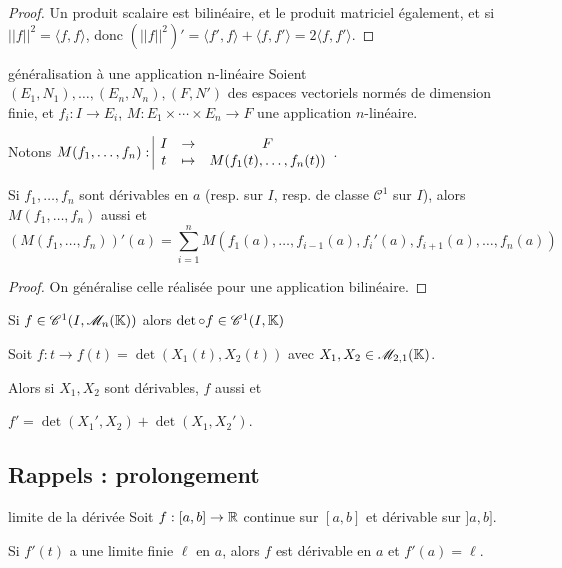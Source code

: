 
\begin{proof}
    Un produit scalaire est bilinéaire, et le produit matriciel également, et si 
    $||f||^2 = \langle f, f \rangle$, donc $(||f||^2)' = \langle f', f \rangle + \langle f, f' \rangle = 2 \langle f, f' \rangle$.
\end{proof}

\begin{theoreme}{généralisation à une application n-linéaire}{}
    Soient $(E_1, N_1), \ldots, (E_n, N_n), (F, N')$ des espaces vectoriels normés de dimension finie, et
    $f_i : I \to E_i$, $M : E_1 \times \cdots \times E_n \to F$ une application $n$-linéaire.

    \avspace Notons $M(f_1, \ldots, f_n): \space \begin{array}{|ccc} \displaystyle I & \to & \displaystyle F \\ \displaystyle t & \mapsto & \displaystyle M(f_1(t), \ldots, f_n(t)) \end{array}$.

    \avspace Si $f_1, \ldots, f_n$ sont dérivables en $a$ (resp. sur $I$, resp. de classe $\mathscr C^1$ sur $I$),
    alors $M(f_1, \ldots, f_n)$ aussi et 
    $$(M(f_1, \ldots, f_n))'(a) = \sum_{i=1}^n M(f_1(a), \ldots, f_{i-1}(a), f_i'(a), f_{i+1}(a), \ldots, f_n(a))$$
\end{theoreme}

\begin{proof}
    On généralise celle réalisée pour une application bilinéaire.
\end{proof}

\begin{corollaire}{}{}
    Si $f \in \mathscr C^1(I, \mathscr M_n(\mathbb{K}))$ alors $\det \circ f \in \mathscr C^1(I, \mathbb{K})$
\end{corollaire}

\begin{exemple}
    Soit $f: t \to f(t) = \det(X_1(t), X_2(t))$ avec $X_1, X_2 \in \mathscr M_{2, 1}(\mathbb{K})$. 

    Alors si $X_1, X_2$ sont dérivables, $f$ aussi et 

    $f' = \det(X_1', X_2) + \det(X_1, X_2')$.
\end{exemple}

\subsection{Rappels : prolongement }

\begin{theoreme}{limite de la dérivée}{}
    Soit $f : [a, b] \to \mathbb{R}$ continue sur $[a, b]$ et dérivable sur $]a, b]$. 

    Si $f'(t)$ a une limite finie $\ell$ en $a$, alors $f$ est dérivable en $a$ et $f'(a) = \ell$.

\end{theoreme}

